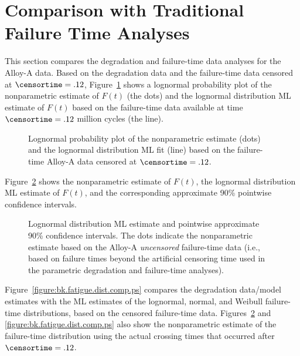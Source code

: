 \section{Comparison with Traditional Failure Time Analyses}
\label{section:compare.ft.da}
This section compares the degradation and failure-time data analyses
for the Alloy-A data. Based on the degradation data and the
failure-time data censored at $\censortime=.12$,
Figure~\ref{figure:bk.fatigue.lognor.cen.ps} shows a lognormal
probability plot of the nonparametric estimate of $F(t)$ (the dots)
and the lognormal distribution ML estimate of $F(t)$ based on the
failure-time data available at time $\censortime=.12$ million cycles
(the line).
\begin{figure}
\caption{Lognormal probability plot of the nonparametric estimate
(dots) and the lognormal distribution ML fit (line) based on the
failure-time Alloy-A data censored at $\censortime=.12$.}
\label{figure:bk.fatigue.lognor.cen.ps}
\end{figure}  
Figure~\ref{figure:bk.fatigue.lognor.all.ps} shows the nonparametric
estimate of $F(t)$, the lognormal distribution ML
estimate of $F(t)$, and the corresponding approximate 90\% pointwise
confidence intervals.
\begin{figure}
\caption{Lognormal
distribution ML estimate and pointwise approximate 90\% confidence
intervals.  The dots indicate the nonparametric estimate based on the
Alloy-A {\em uncensored} failure-time data (i.e., based on failure
times beyond the artificial censoring time used in the parametric
degradation and failure-time analyses).}
\label{figure:bk.fatigue.lognor.all.ps}
\end{figure}
Figure~\ref{figure:bk.fatigue.dist.comp.ps} compares the degradation
data/model estimates with the ML estimates of the lognormal, normal,
and Weibull failure-time distributions, based on the censored
failure-time data.  Figures~\ref{figure:bk.fatigue.lognor.all.ps}
and \ref{figure:bk.fatigue.dist.comp.ps} also show the nonparametric
estimate of the failure-time distribution using the actual crossing
times that occurred after $\censortime=.12$.

